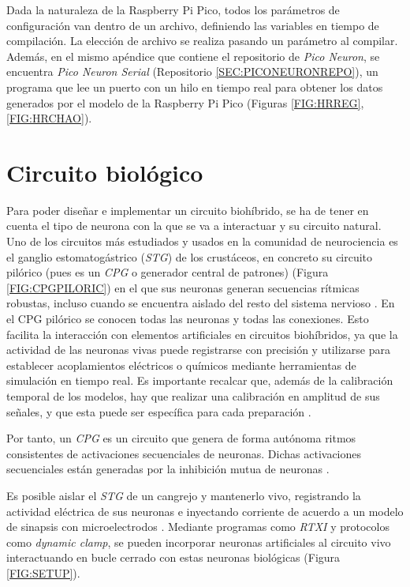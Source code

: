 Dada la naturaleza de la Raspberry Pi Pico, todos los parámetros de configuración van dentro de un archivo, definiendo las variables en tiempo de compilación. La elección de archivo se realiza pasando un parámetro al compilar. Además, en el mismo apéndice que contiene el repositorio de \textit{Pico Neuron}, se encuentra \textit{Pico Neuron Serial} (Repositorio \ref{SEC:PICONEURONREPO}), un programa que lee un puerto con un hilo en tiempo real para obtener los datos generados por el modelo de la Raspberry Pi Pico (Figuras \ref{FIG:HRREG}, \ref{FIG:HRCHAO}).

\section{Circuito biológico\label{SEC:CIRCBIO}}


Para poder diseñar e implementar un circuito biohíbrido, se ha de tener en cuenta el tipo de neurona con la que se va a interactuar y su circuito natural. Uno de los circuitos más estudiados y usados en la comunidad de neurociencia es el ganglio estomatogástrico (\textit{STG}) de los crustáceos, en concreto su circuito pilórico (pues es un \textit{CPG} o generador central de patrones) (Figura \ref{FIG:CPGPILORIC}) en el que sus neuronas generan secuencias rítmicas robustas, incluso cuando se encuentra aislado del resto del sistema nervioso \cite{Selverston2000, Szcs2000}. En el CPG pilórico se conocen todas las neuronas y todas las conexiones. Esto facilita la interacción con elementos artificiales en circuitos biohíbridos, ya que la actividad de las neuronas vivas puede registrarse con precisión y utilizarse para establecer acoplamientos eléctricos o químicos mediante herramientas de simulación en tiempo real. Es importante recalcar que, además de la calibración temporal de los modelos, hay que realizar una calibración en amplitud de sus señales, y que esta puede ser específica para cada preparación \cite{Reyes-Sanchez2020, ReyesSnchez2023}.

Por tanto, un \textit{CPG} es un circuito que genera de forma autónoma ritmos consistentes de activaciones secuenciales de neuronas. Dichas activaciones secuenciales están generadas por la inhibición mutua de neuronas \cite{Selverston2000, ReyesSnchez2023}.

Es posible aislar el \textit{STG} de un cangrejo y mantenerlo vivo, registrando la actividad eléctrica de sus neuronas e inyectando corriente de acuerdo a un modelo de sinapsis con microelectrodos \cite{Reyes-Sanchez2020}. Mediante programas como \textit{RTXI} y protocolos como \textit{dynamic clamp}, se pueden incorporar neuronas artificiales al circuito vivo interactuando  en bucle cerrado con estas neuronas biológicas \cite{Amaducci2022, Reyes-Sanchez2020} (Figura \ref{FIG:SETUP}).

